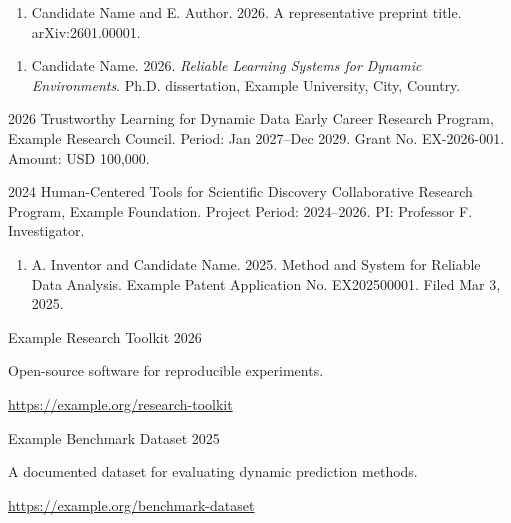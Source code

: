 
\begin{enumerate}
    \item Candidate Name and E. Author. 2026.
    A representative preprint title. arXiv:2601.00001.
\end{enumerate}


\begin{enumerate}
    \item Candidate Name. 2026.
    \textit{Reliable Learning Systems for Dynamic Environments}.
    Ph.D. dissertation, Example University, City, Country.
\end{enumerate}




\begin{cvchronologylist}
    \cvfundingitem
        {2026}
        {Trustworthy Learning for Dynamic Data}
        {Early Career Research Program, Example Research Council.}
        {Period: Jan 2027--Dec 2029. Grant No. EX-2026-001. Amount: USD 100,000.}
        {}
\end{cvchronologylist}


\begin{cvchronologylist}
    \cvfundingitem
        {2024}
        {Human-Centered Tools for Scientific Discovery}
        {Collaborative Research Program, Example Foundation.}
        {Project Period: 2024--2026. PI: Professor F. Investigator.}
        {}
\end{cvchronologylist}




\begin{enumerate}
    \item A. Inventor and Candidate Name. 2025.
    Method and System for Reliable Data Analysis.
    Example Patent Application No. EX202500001. Filed Mar 3, 2025.
\end{enumerate}




\begin{cvrecordlist}
    \cvdateditem
        {Example Research Toolkit}
        {2026}
        {Open-source software for reproducible experiments.\par
         \url{https://example.org/research-toolkit}}
    \cvdateditem
        {Example Benchmark Dataset}
        {2025}
        {A documented dataset for evaluating dynamic prediction methods.\par
         \url{https://example.org/benchmark-dataset}}
\end{cvrecordlist}


